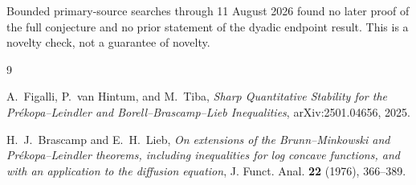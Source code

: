 \documentclass[11pt]{article}
\theoremstyle{remark}
\begin{document}
Bounded primary-source searches through 11 August 2026 found no later proof
of the full conjecture and no prior statement of the dyadic endpoint result.
This is a novelty check, not a guarantee of novelty.

\begin{thebibliography}{9}

A.~Figalli, P.~van Hintum, and M.~Tiba,
\emph{Sharp Quantitative Stability for the Pr\'ekopa--Leindler and
Borell--Brascamp--Lieb Inequalities}, arXiv:2501.04656, 2025.

H.~J.~Brascamp and E.~H.~Lieb,
\emph{On extensions of the Brunn--Minkowski and Pr\'ekopa--Leindler
theorems, including inequalities for log concave functions, and with an
application to the diffusion equation}, J. Funct. Anal. \textbf{22} (1976),
366--389.

\end{thebibliography}
\end{document}
